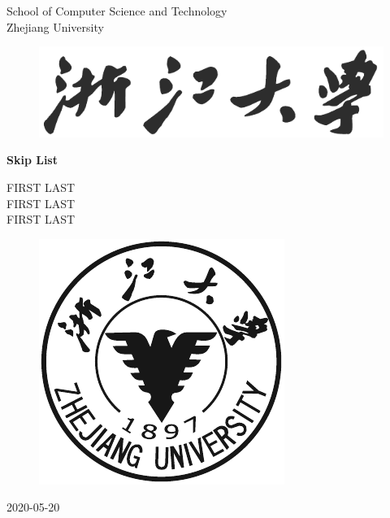 \documentclass[10pt,english, openany]{book}
\begin{document}

\begin{titlepage}
	\clearpage\thispagestyle{empty}
	\centering
	\vspace{1cm}

	{\normalsize School of Computer Science and Technology \\ 
	Zhejiang University \par}
	\vspace{1cm}
	
	\begin{figure}[h]
		\centering
		\includegraphics{Figures/ZJDX}
	\end{figure}	
	\vspace{1cm}
		
	{\Huge \textbf{Skip List}} \\
	\vspace{3cm}
	{\normalsize FIRST LAST \\ %
	             FIRST LAST \\
	             FIRST LAST\par}
	\vspace{2cm}
    \begin{figure}[h]
    	\centering 
    	\includegraphics{Figures/QSY}
    \end{figure}
       
    \vspace{0.5cm}
		
	{\normalsize 2020-05-20 \par}
	
	\pagebreak

\end{titlepage}
\end{document}
